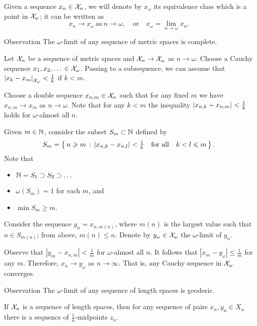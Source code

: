 Given a sequence $x_n\in \mathcal{X}_n$,
we will denote by $x_\omega$ its equivalence class which is a point in $\mathcal{X}_\omega$;
it can be written as
\[x_n\to x_\omega\ \text{as}\  n\to\omega,
\quad\text{or}\quad
x_\omega=\lim_{n\to\omega} x_n.\]

\begin{thm}{Observation}\label{obs:ultralimit-is-complete}
The $\omega$-limit of any sequence of metric spaces is complete. 
\end{thm}

Let $\mathcal{X}_n$ be a sequence of metric spaces and $\mathcal{X}_n\to\mathcal{X}_\omega$ as $n\to\omega$.
Choose a Cauchy sequence $x_1,x_2,\dots{}\in\mathcal{X}_\omega$.
Passing to a subsequence, we can assume that $\dist{x_k}{x_{m}}{\spc{X}_\omega}<\tfrac1{k}$ if $k<m$.

Choose a double sequence $x_{n,m}\in \mathcal{X}_n$ such that for any fixed $m$ we have $x_{n,m}\to x_m$ as $n\to\omega$.
Note that for any $k<m$ the inequality $\dist{x_{n,k}}{x_{n,m}}{}<\tfrac1{k}$ holds for $\omega$-almost all $n$.

Given $m\in\mathbb{N}$, consider the subset $S_m\subset\mathbb{N}$ defined by
\[S_m=\set{n\ge m}{\dist{x_{n,k}}{x_{n,l}}{}<\tfrac1{k} \quad\text{for all}\quad k<l\le m}.\]
Note that 
\begin{itemize}
\item $\mathbb{N}= S_1\supset S_2\supset\dots$
\item $\omega(S_m)=1$ for each $m$, and
\item $\min S_m\ge m$.
\end{itemize}

Consider the sequence $y_n=x_{n,m(n)}$, where $m(n)$ is the largest value such that $n\in S_{m(n)}$;
from above, $m(n)\le n$.
Denote by $y_\omega\in \mathcal{X}_\omega$ the $\omega$-limit of $y_n$.

Observe that $|y_m-x_{n,m}|<\tfrac1{m}$ for $\omega$-almost all $n$.
It follows that $|x_m-y_\omega|\le \tfrac1{m}$ for any $m$.
Therefore, $x_n\to y_\omega$ as $n\to \infty$.
That is, any Cauchy sequence in $\mathcal{X}_\omega$ converges.
\qeds

\begin{thm}{Observation}\label{obs:ultralimit-is-geodesic}
The $\omega$-limit of any sequence of length spaces is geodesic. 
\end{thm}

If $\mathcal{X}_n$ is a sequence of length spaces, then for any sequence of pairs $x_n, y_n\in X_n$ there is a sequence of $\tfrac1n$-midpoints $z_n$.


